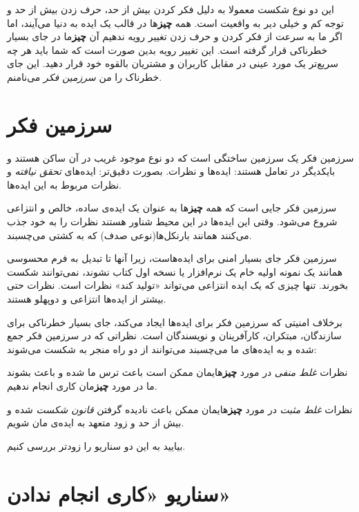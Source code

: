 این دو نوع شکست معمولا به دلیل فکر کردن بیش از حد، حرف زدن بیش از حد و
توجه کم و خیلی دیر به واقعیت است. همه \textbf{چیز}ها در قالب یک ایده به
دنیا می‌آیند، اما اگر ما به سرعت از فکر کردن و حرف زدن تغییر رویه ندهیم
آن \textbf{چیز}ما در جای بسیار خطرناکی قرار گرفته است. این تغییر رویه
بدین صورت است که شما باید هر چه سریع‌تر یک مورد عینی در مقابل کاربران و
مشتریان بالقوه خود قرار دهید. این جای خطرناک را من \emph{سرزمین فکر}
می‌نامنم.

\section{سرزمین
فکر}\label{ux633ux631ux632ux645ux6ccux646-ux641ux6a9ux631}

سرزمین فکر یک سرزمین ساختگی است که دو نوع موجود غریب در آن ساکن هستند و
بایکدیگر در تعامل هستند: ایده‌ها و نظرات. بصورت دقیق‌تر: ایده‌های
\emph{تحقق نیافته} و نظرات مربوط به این ایده‌ها.

سرزمین فکر جایی است که همه \textbf{چیز}ها به عنوان یک ایده‌ی ساده، خالص
و انتزاعی شروع می‌شود. وقتی این ایده‌ها در این محیط شناور هستند نظرات را
به خود جذب می‌کنند همانند بارنکل‌ها(نوعی صدف) که به کشتی می‌چسبند.

سرزمین فکر جای بسیار امنی برای ایده‌هاست، زیرا آنها تا تبدیل به فرم
محسوسی همانند یک نمونه اولیه خام یک نرم‌افزار یا نسخه اول کتاب نشوند،
نمی‌توانند شکست بخورند. تنها چیزی که یک ایده انتزاعی می‌تواند «تولید
کند» نظرات است. نظرات حتی بیشتر از ایده‌ها انتزاعی و دوپهلو هستند.

برخلاف امنیتی که سرزمین فکر برای ایده‌ها ایجاد می‌کند، جای بسیار خطرناکی
برای سازندگان، مبتکران، کارآفرینان و نویسندگان است. نظراتی که در سرزمین
فکر جمع شده و به ایده‌های ما می‌چسبند می‌توانند از دو راه منجر به شکست
می‌شوند:

نظرات \emph{غلط منفی} در مورد \textbf{چیز}هایمان ممکن است باعث ترس ما
شده و باعث بشوند ما در مورد \textbf{چیز}مان کاری انجام ندهیم.

نظرات \emph{غلط مثبت} در مورد \textbf{چیز}هایمان ممکن باعث نادیده گرفتن
\emph{قانون شکست} شده و بیش از حد و زود متعهد به ایده‌ی مان شویم.

بیایید به این دو سناریو را زودتر بررسی کنیم.

\section{سناریو «کاری انجام
ندادن»}\label{ux633ux646ux627ux631ux6ccux648-ux6a9ux627ux631ux6cc-ux627ux646ux62cux627ux645-ux646ux62fux627ux62fux646}

